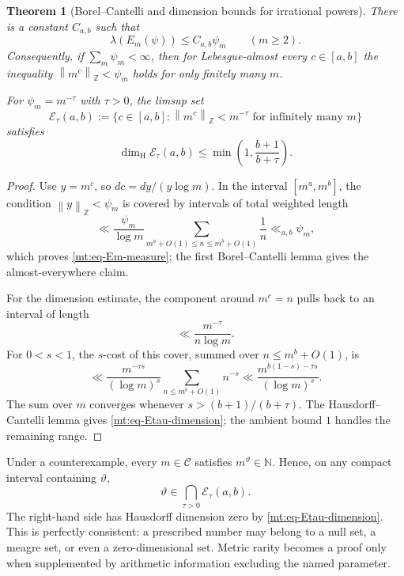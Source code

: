 \documentclass[11pt,oneside]{article}
\newtheorem{theorem}{Theorem}[section]
\theoremstyle{definition}
\theoremstyle{remark}
\newcommand{\N}{\mathbb N}
\newcommand{\Z}{\mathbb Z}
\newcommand{\thetaq}{\vartheta}
\newcommand{\Cand}{\mathcal C}
\newcommand{\distZ}[1]{\left\lVert #1\right\rVert_{\Z}}
\begin{document}
\begin{theorem}[Borel--Cantelli and dimension bounds for irrational powers]
\label{mt:thm-metric-parameter}
There is a constant $C_{a,b}$ such that
\begin{equation}
 \lambda(E_m(\psi))\le C_{a,b}\psi_m
 \qquad(m\ge2).
 \label{mt:eq-Em-measure}
\end{equation}
Consequently, if $\sum_m\psi_m<\infty$, then for Lebesgue-almost every $c\in[a,b]$ the
inequality $\distZ{m^c}<\psi_m$ holds for only finitely many $m$.

For $\psi_m=m^{-\tau}$ with $\tau>0$, the limsup set
\begin{equation}
 \mathcal E_\tau(a,b):=
 \{c\in[a,b]:\distZ{m^c}<m^{-\tau}
   \text{ for infinitely many }m\}
 \label{mt:eq-Etau}
\end{equation}
satisfies
\begin{equation}
 \dim_{\mathrm H}\mathcal E_\tau(a,b)
 \le \min\!\left(1,\frac{b+1}{b+\tau}\right).
 \label{mt:eq-Etau-dimension}
\end{equation}
\end{theorem}

\begin{proof}
Use $y=m^c$, so $dc=dy/(y\log m)$.  In the interval
$[m^a,m^b]$, the condition $\distZ y<\psi_m$ is covered by intervals of total weighted length
\[
 \ll \frac{\psi_m}{\log m}
 \sum_{m^a+O(1)\le n\le m^b+O(1)}\frac1n
 \ll_{a,b}\psi_m,
\]
which proves \eqref{mt:eq-Em-measure}; the first Borel--Cantelli lemma gives the almost-everywhere
claim.

For the dimension estimate, the component around $m^c=n$ pulls back to an interval of length
\[
 \ll\frac{m^{-\tau}}{n\log m}.
\]
For $0<s<1$, the $s$-cost of this cover, summed over $n\le m^b+O(1)$, is
\[
 \ll
 \frac{m^{-\tau s}}{(\log m)^s}
 \sum_{n\le m^b+O(1)}n^{-s}
 \ll
 \frac{m^{b(1-s)-\tau s}}{(\log m)^s}.
\]
The sum over $m$ converges whenever
$s>(b+1)/(b+\tau)$.  The Hausdorff--Cantelli lemma gives
\eqref{mt:eq-Etau-dimension}; the ambient bound $1$ handles the remaining range.
\end{proof}

Under a counterexample, every $m\in\Cand$ satisfies $m^{\thetaq}\in\N$.  Hence, on any compact
interval containing $\thetaq$,
\begin{equation}
 \thetaq\in\bigcap_{\tau>0}\mathcal E_\tau(a,b).
 \label{mt:eq-theta-all-tau}
\end{equation}
The right-hand side has Hausdorff dimension zero by
\eqref{mt:eq-Etau-dimension}.  This is perfectly consistent: a prescribed number may belong to
a null set, a meagre set, or even a zero-dimensional set.  Metric rarity becomes a proof only
when supplemented by arithmetic information excluding the named parameter.
\end{document}
